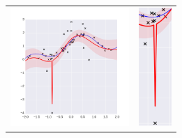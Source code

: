 \begin{figure}
\begin{subfigure}[b]{0.49\textwidth}\centering
\begin{tabular}{ll}
\includegraphics[height=4.5cm]{figs/neal_deterministic.png} &  \includegraphics[height=4.5cm]{figs/outlier.png}
\end{tabular}
          \caption{}
          \label{fig:deterministic}
\end{subfigure}          
\begin{subfigure}[b]{0.49\textwidth}\centering
\centering
\begin{tabular}{ll}

\end{tabular}
\end{subfigure}
\end{figure}
